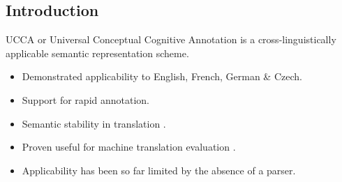 \documentclass[a0,portrait]{a0poster}
\begin{document}
\begin{multicols}{2} %


\color{Black} %

\section*{Introduction}


\begin{table}
  \vspace{-25mm}
  \begin{adjustbox}{margin=2mm,frame}
  \end{adjustbox}
\end{table}

UCCA or Universal Conceptual Cognitive Annotation \cite{abend2013universal}
is a cross-linguistically applicable semantic representation scheme.
\begin{itemize}
 \item Demonstrated applicability to English, French, German \& Czech.
 \item Support for rapid annotation.
 \item Semantic stability in translation \cite{sulem2015conceptual}.
 \item Proven useful for machine translation evaluation \cite{birch2016hume}.
 \item Applicability has been so far limited by the absence of a parser.
\end{itemize}


\end{multicols}
\end{document}
